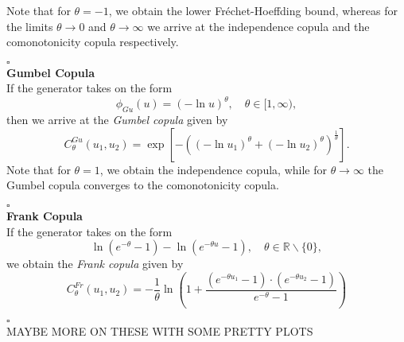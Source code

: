 Note that for $\theta=-1$, we obtain the lower Fr\'echet-Hoeffding bound, whereas for the limits $\theta \rightarrow 0$ and $\theta \rightarrow \infty$ we arrive at the independence copula and the comonotonicity copula respectively.

\hfill $\square$ \\

\textbf{Gumbel Copula}\\
If the generator takes on the form
\begin{equation}
\phi_{G u}(u)=(-\ln u)^{\theta}, \quad \theta \in [1, \infty),
\end{equation}
then we arrive at the \textit{Gumbel copula} given by
\begin{equation}
C_{\theta}^{G u}\left(u_{1}, u_{2}\right)=\exp \left[-\left(\left(-\ln u_{1}\right)^{\theta}+\left(-\ln u_{2}\right)^{\theta}\right)^{\frac{1}{\theta}}\right].
\end{equation}
Note that for $\theta= 1$, we obtain the independence copula, while for $\theta \rightarrow \infty$ the Gumbel copula converges to the comonotonicity copula.

\hfill $\square$ \\


\textbf{Frank Copula}\\
If the generator takes on the form
\begin{equation}
\ln \left(e^{-\theta}-1\right)-\ln \left(e^{-\theta u}-1\right), \quad \theta \in \mathbb{R} \backslash\{0\},
\end{equation}
we obtain the \textit{Frank copula} given by
\begin{equation}
C_{\theta}^{F r}\left(u_{1}, u_{2}\right)=-\frac{1}{\theta} \ln \left(1+\frac{\left(e^{-\theta u_{1}}-1\right) \cdot\left(e^{-\theta u_{2}}-1\right)}{e^{-\theta}-1}\right)
\end{equation}

\hfill $\square$ \\


MAYBE MORE ON THESE WITH SOME PRETTY PLOTS





